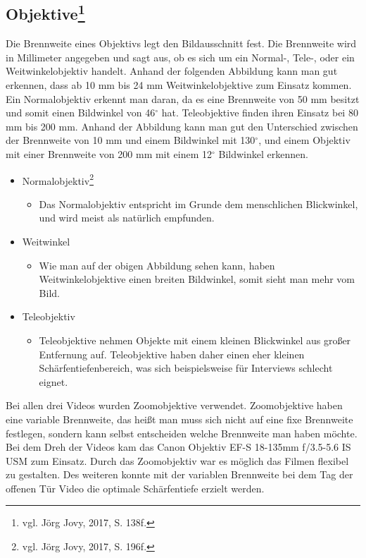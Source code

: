\subsection[Objektive]{Objektive\protect\footnote{\label{}vgl. Jörg Jovy, 2017, S. 138f.}}
Die Brennweite eines Objektivs legt den Bildausschnitt fest. Die Brennweite wird in Millimeter angegeben und sagt aus, ob es sich um ein Normal-, Tele-, oder ein Weitwinkelobjektiv handelt.
Anhand der folgenden Abbildung kann man gut erkennen, dass ab 10 mm bis 24 mm Weitwinkelobjektive zum Einsatz kommen. Ein Normalobjektiv erkennt man daran, da es eine Brennweite von 50 mm besitzt und somit einen Bildwinkel von 46$^\circ$ hat. Teleobjektive finden ihren Einsatz bei 80 mm bis 200 mm. Anhand der Abbildung kann man gut den Unterschied zwischen der Brennweite von 10 mm und einem Bildwinkel mit 130$^\circ$, und einem Objektiv mit einer Brennweite von 200 mm mit einem 12$^\circ$ Bildwinkel erkennen. 
\begin{itemize}
	\item Normalobjektiv\footnote{\label{}vgl. Jörg Jovy, 2017, S. 196f.}
		\begin{itemize}
		\item Das Normalobjektiv entspricht im Grunde dem menschlichen Blickwinkel, und wird meist als natürlich empfunden. 
		\end{itemize}
	\item Weitwinkel
		\begin{itemize}
		\item Wie man auf der obigen Abbildung sehen kann, haben Weitwinkelobjektive einen breiten Bildwinkel, somit sieht man mehr vom Bild. 
		\end{itemize}
	\item Teleobjektiv
		\begin{itemize}
		\item Teleobjektive nehmen Objekte mit einem kleinen Blickwinkel aus großer Entfernung auf. Teleobjektive haben daher einen eher kleinen Schärfentiefenbereich, was sich beispielsweise für Interviews schlecht eignet. 
\end{itemize}
\end{itemize}
Bei allen drei Videos wurden Zoomobjektive verwendet. Zoomobjektive haben eine variable Brennweite, das heißt man muss sich nicht auf eine fixe Brennweite festlegen, sondern kann selbst entscheiden welche Brennweite man haben möchte. Bei dem Dreh der Videos kam das Canon Objektiv EF-S 18-135mm f/3.5-5.6 IS USM zum Einsatz. Durch das Zoomobjektiv war es möglich das Filmen flexibel zu gestalten. Des weiteren konnte mit der variablen Brennweite bei dem Tag der offenen Tür Video die optimale Schärfentiefe erzielt werden.